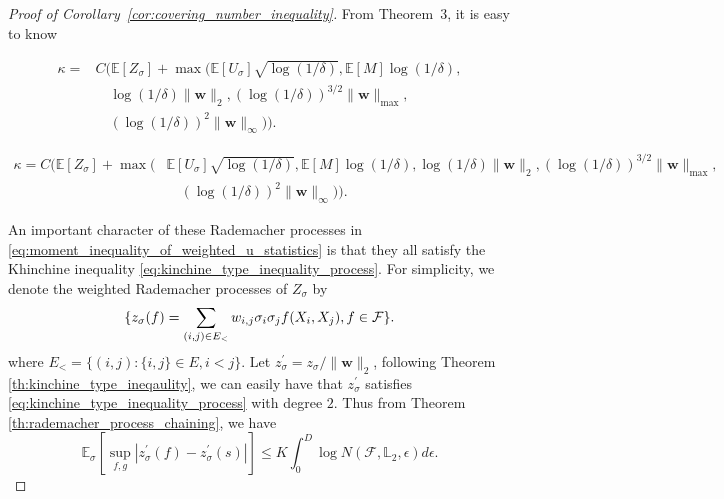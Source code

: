 \documentclass[letterpaper]{article} %
\def\DoubleColumn{}
\def\DoubleColumnEnd{}
\def\SingleColumn{}
\def\SingleColumnEnd{}
\newcommand{\E}{\mathbb{E}}
\newcommand{\weight}{\mathbf{w}}
\newcommand{\rademacher}{\sigma}
\newcommand{\pair}[1]{(#1)}
\newcommand{\lnorm}{\mathbb{L}}
\begin{document}
\begin{proof}[Proof of Corollary~\ref{cor:covering_number_inequality}] %
    From Theorem~$3$, it is easy to know
    \DoubleColumn
    \begin{equation}
        \begin{aligned}
            \label{eq:moment_inequality_of_weighted_u_statistics}
            \kappa=&C(\E[Z_\rademacher]+\max(\E[U_\rademacher]\sqrt{\log(1/\delta)},\E[M]\log(1/\delta),\\
            &\quad\log(1/\delta)\|\weight{}\|_2,(\log(1/\delta))^{3/2}\|\weight{}\|_{\max},\\
            &\quad (\log(1/\delta))^2\|\weight{}\|_\infty)).
        \end{aligned}
    \end{equation}
    \DoubleColumnEnd
    \SingleColumn
    \begin{equation}
        \begin{aligned}
            \label{eq:moment_inequality_of_weighted_u_statistics}
            \kappa=C(\E[Z_\rademacher]+\max(&\E[U_\rademacher]\sqrt{\log(1/\delta)},\E[M]\log(1/\delta),\log(1/\delta)\|\weight{}\|_2,(\log(1/\delta))^{3/2}\|\weight{}\|_{\max},\\
            &\quad (\log(1/\delta))^2\|\weight{}\|_\infty)).
        \end{aligned}
    \end{equation}
    \SingleColumnEnd
An important character of these Rademacher processes in \eqref{eq:moment_inequality_of_weighted_u_statistics} is that they all satisfy the Khinchine inequality \eqref{eq:kinchine_type_inequality_process}. For simplicity, we denote the weighted Rademacher processes of $Z_\rademacher$ by 
\[\{z_\rademacher(f)=\sum_{\pair{i,j}\in E_<}w_{i,j}\rademacher_i\rademacher_j\linebreak f(X_i,X_j), f\in\mathcal{F}\}.\]
where $E_<=\{(i,j): \{i,j\}\in E, i<j\}$. Let $z_\rademacher^\prime=z_\rademacher/\|\weight{}\|_2$, following Theorem \ref{th:kinchine_type_ineqaulity}, we can easily have that $z_\rademacher^\prime$ satisfies \eqref{eq:kinchine_type_inequality_process} with degree $2$. Thus from Theorem \ref{th:rademacher_process_chaining}, we have
\begin{equation}
    \label{eq:weighted_rademacher_process_prove_1}
    \E_\rademacher[\sup_{f,g}|z^\prime_\rademacher(f)-z^\prime_\rademacher(s)|]\le K\int_0^D\log N(\mathcal F,\lnorm{}_2,\epsilon)d\epsilon.
\end{equation}

\end{proof}
\end{document}
